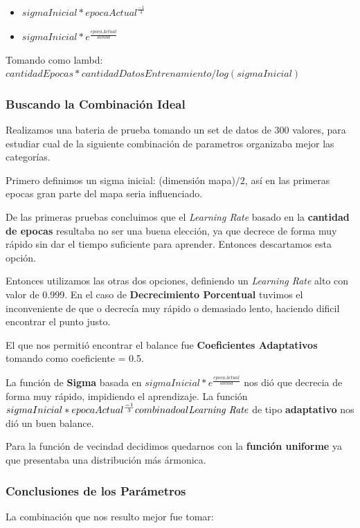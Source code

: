 \begin{itemize}
	\item $sigmaInicial * {epocaActual^\frac{-1}{3}}$
	\item $sigmaInicial * e^\frac{epocaActual}{lambd}$
\end{itemize}

Tomando como lambd: $cantidadEpocas * cantidadDatosEntrenamiento / log (sigmaInicial)$


\subsubsection{Buscando la Combinación Ideal}

Realizamos una bateria de prueba tomando un set de datos de 300 valores, para
estudiar cual de la siguiente combinación de parametros organizaba mejor
las categorías.

Primero definimos un sigma inicial: (dimensión mapa)$ / 2$, así en las primeras
epocas gran parte del mapa seria influenciado.

De las primeras pruebas concluimos que el \emph{Learning Rate} basado en la 
\textbf{cantidad de epocas} resultaba no ser una buena elección, ya que
decrece de forma muy rápido sin dar el tiempo suficiente para aprender.
Entonces descartamos esta opción.

Entonces utilizamos las otras dos opciones, definiendo un \emph{Learning Rate}
alto con valor de 0.999. En el caso de \textbf{Decrecimiento Porcentual}
tuvimos el inconveniente de que o decrecía muy rápido o demasiado lento, haciendo
dificil encontrar el punto justo.

El que nos permitió encontrar el balance fue \textbf{Coeficientes Adaptativos}
tomando como coeficiente = 0.5.

La función de \textbf{Sigma} basada en $sigmaInicial * e^\frac{epocaActual}{lambd}$
nos dió que decrecia de forma muy rápido, impidiendo el aprendizaje.
La función $sigmaInicial * {epocaActual^\frac{-1}{3}} combinado al \emph{Learning Rate}$
de tipo \textbf{adaptativo} nos dió un buen balance.

Para la función de vecindad decidimos quedarnos con la \textbf{función uniforme} ya
que presentaba una distribución más ármonica.

\subsubsection{Conclusiones de los Parámetros}

La combinación que nos resulto mejor fue tomar:


